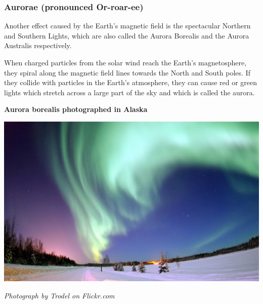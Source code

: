             \subsubsection{Aurorae (pronounced Or-roar-ee) }
            \nopagebreak
\label{m37830*fs-id1166211416999}
Another effect caused by the Earth's magnetic field is the spectacular Northern and Southern Lights, which are also called the Aurora Borealis and the Aurora Australis respectively.\par
\begin{minipage}{.6\textwidth}
 When charged particles from the solar wind reach the Earth's magnetosphere, they spiral along the magnetic field lines towards the North and South poles. If they collide with particles in the Earth's atmosphere, they can cause red or green lights which stretch across a large part of the sky and which is called the aurora. 
\begin{center}
  \textbf{Aurora borealis photographed in Alaska}\par
  \includegraphics[width=.8\textwidth]{photos/aurora_borealis_Trodel.jpg}\par
  \textit{Photograph by Trodel on Flickr.com}
 \end{center}
\end{minipage}
